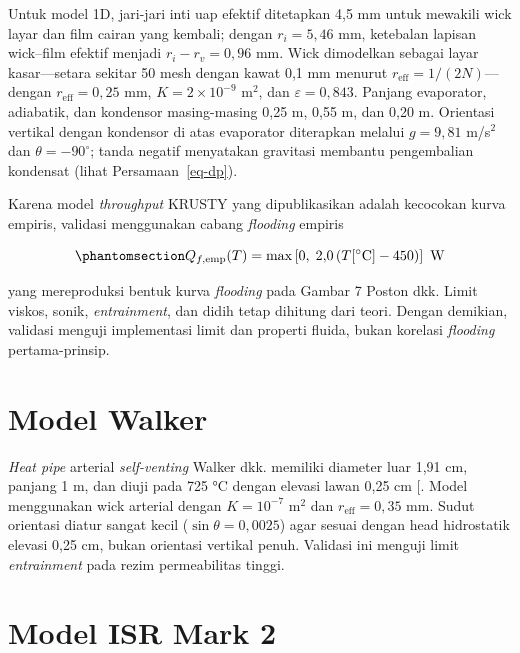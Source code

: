 \documentclass[
  indonesian,
  12pt,
  a4paper,
]{report}
\begin{document}
Untuk model 1D, jari-jari inti uap efektif ditetapkan 4,5 mm untuk
mewakili wick layar dan film cairan yang kembali; dengan \(r_i=5{,}46\)
mm, ketebalan lapisan wick--film efektif menjadi \(r_i-r_v=0{,}96\) mm.
Wick dimodelkan sebagai layar kasar---setara sekitar 50 mesh dengan
kawat 0,1 mm menurut \(r_{\mathrm{eff}}=1/(2N)\)---dengan
\(r_{\mathrm{eff}}=0{,}25\) mm, \(K=2\times10^{-9}\) m\(^2\), dan
\(\varepsilon=0{,}843\). Panjang evaporator, adiabatik, dan kondensor
masing-masing 0,25 m, 0,55 m, dan 0,20 m. Orientasi vertikal dengan
kondensor di atas evaporator diterapkan melalui \(g=9{,}81\) m/s\(^2\)
dan \(\theta=-90^\circ\); tanda negatif menyatakan gravitasi membantu
pengembalian kondensat (lihat Persamaan~\ref{eq-dp}).

Karena model \emph{throughput} KRUSTY yang dipublikasikan adalah
kecocokan kurva empiris, validasi menggunakan cabang \emph{flooding}
empiris

\begin{equation}\protect\phantomsection\label{eq-qemp}{ Q_{f,\mathrm{emp}}(T) = \max\left[0,\;2{,}0\,(T[^\circ\mathrm{C}]-450)\right]
   \ \mathrm{W} }\end{equation}

yang mereproduksi bentuk kurva \emph{flooding} pada Gambar 7 Poston dkk.
Limit viskos, sonik, \emph{entrainment}, dan didih tetap dihitung dari
teori. Dengan demikian, validasi menguji implementasi limit dan properti
fluida, bukan korelasi \emph{flooding} pertama-prinsip.

\section{Model Walker}\label{model-walker}

\emph{Heat pipe} arterial \emph{self-venting} Walker dkk. memiliki
diameter luar 1,91 cm, panjang 1 m, dan diuji pada 725 °C dengan elevasi
lawan 0,25 cm {[}\citeproc{ref-walker2013}{12}{]}. Model menggunakan
wick arterial dengan \(K=10^{-7}\) m\(^2\) dan
\(r_{\mathrm{eff}}=0{,}35\) mm. Sudut orientasi diatur sangat kecil
(\(\sin\theta=0{,}0025\)) agar sesuai dengan head hidrostatik elevasi
0,25 cm, bukan orientasi vertikal penuh. Validasi ini menguji limit
\emph{entrainment} pada rezim permeabilitas tinggi.

\section{Model ISR Mark 2}\label{model-isr-mark-2}
\end{document}
